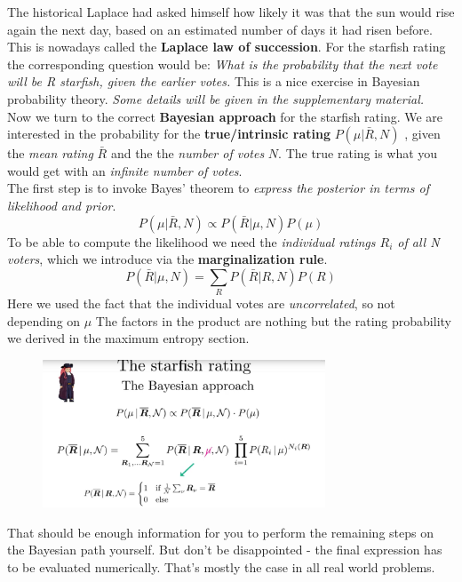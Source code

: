 \documentclass[12pt, a4paper]{scrartcl}
\begin{document}
The historical Laplace had asked himself how likely it was that the sun would
rise again the next day, based on an estimated number of days it had risen
before. This is nowadays called the \textbf{Laplace law of succession}.
For the starfish rating the corresponding question would be: \textit{What is the
probability that the next vote will be R starfish, given the earlier votes.} This
is a nice exercise in Bayesian probability theory. \textit{Some details will be given
in the supplementary material.}\\


Now we turn to the correct \textbf{Bayesian approach} for the starfish rating. We
are interested in the probability for the \textbf{true/intrinsic rating} $P(\mu|\bar{R},N)$ , given the \textit{mean rating} $\bar{R}$ and the the \textit{number
of votes} $N$. The true rating is what you would get with an \textit{infinite number of votes}.\\

The first step is to invoke Bayes’ theorem to \textit{express the posterior in terms of likelihood and prior}.
\[P(\mu|\bar{R},N)\propto P(\bar{R}|\mu,N)P(\mu)\]
To be able to
compute the likelihood we need the \textit{individual ratings $R_i$ of all N voters},
which we introduce via the \textbf{marginalization rule}.
\[P(\bar{R}|\mu,N)=\sum_RP(\bar{R}|R,N)P(R)\]
 Here we used the fact that the individual votes are \textit{uncorrelated}, so not depending on $\mu$
The factors in the product are nothing but the rating probability we derived
in the maximum entropy section.\\%
 \begin{figure}[H]
	\centering
	\includegraphics[width=0.75\textwidth]{6_10.png}
\end{figure}

That should be enough information for you to perform the remaining steps on
the Bayesian path yourself. But don’t be disappointed - the final expression
has to be evaluated numerically. That’s mostly the case in all real world
problems.\\%
\end{document}
